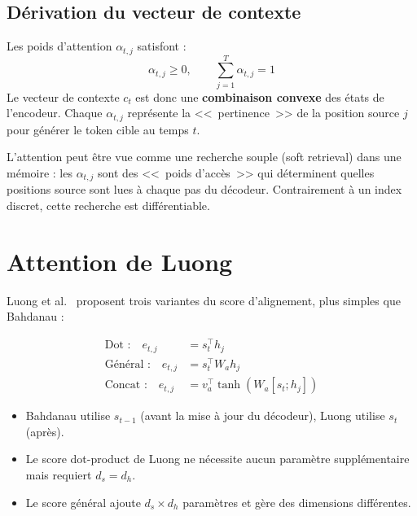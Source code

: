 \subsection{D\'erivation du vecteur de contexte}

\begin{theoreme}
Les poids d'attention $\alpha_{t,j}$ satisfont :
\begin{equation}
\alpha_{t,j} \geq 0, \qquad \sum_{j=1}^T \alpha_{t,j} = 1
\end{equation}
Le vecteur de contexte $c_t$ est donc une \textbf{combinaison convexe} des
\'etats de l'encodeur. Chaque $\alpha_{t,j}$ repr\'esente la
<<~pertinence~>> de la position source $j$ pour g\'en\'erer le token cible
au temps $t$.
\end{theoreme}

\begin{intuition}[title=\textbf{Attention comme recherche souple}]
L'attention peut \^etre vue comme une recherche souple (soft retrieval) dans
une m\'emoire : les $\alpha_{t,j}$ sont des <<~poids d'acc\`es~>> qui
d\'eterminent quelles positions source sont lues \`a chaque pas du d\'ecodeur.
Contrairement \`a un index discret, cette recherche est diff\'erentiable.
\end{intuition}

\section{Attention de Luong}
\label{sec:luong}

Luong et al.\ \cite{luong2015effective} proposent trois variantes du score
d'alignement, plus simples que Bahdanau :

\begin{formules}[title=\textbf{Scores de Luong}]
\begin{align}
\text{Dot :} \quad e_{t,j} &= s_t^\top h_j
\label{eq:luong-dot} \\
\text{G\'en\'eral :} \quad e_{t,j} &= s_t^\top W_a h_j
\label{eq:luong-general} \\
\text{Concat :} \quad e_{t,j} &= v_a^\top \tanh(W_a [s_t ; h_j])
\label{eq:luong-concat}
\end{align}
\end{formules}

\begin{remarque}
\begin{itemize}
  \item Bahdanau utilise $s_{t-1}$ (avant la mise \`a jour du d\'ecodeur),
    Luong utilise $s_t$ (apr\`es).
  \item Le score dot-product de Luong ne n\'ecessite aucun param\`etre
    suppl\'ementaire mais requiert $d_s = d_h$.
  \item Le score g\'en\'eral ajoute $d_s \times d_h$ param\`etres et g\`ere
    des dimensions diff\'erentes.
\end{itemize}
\end{remarque}

